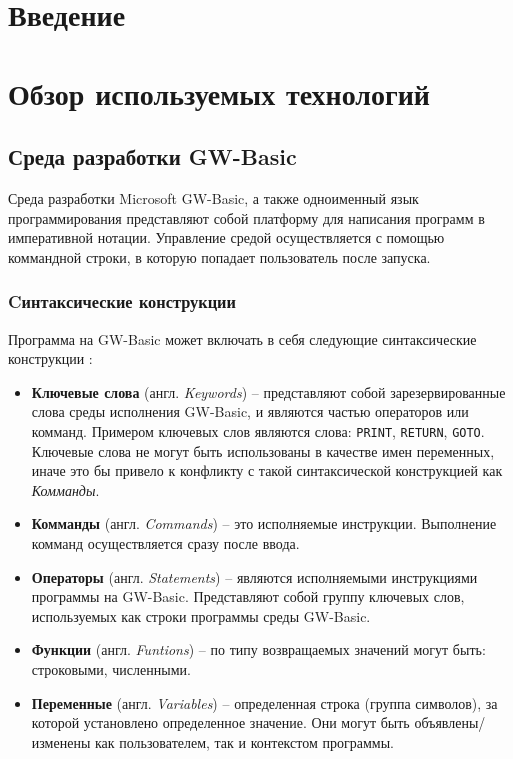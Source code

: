 \documentclass[12pt]{article}
\begin{document}
	\section{Введение}
	\newpage
	\section{Обзор используемых технологий}	
		\subsection{Среда разработки GW-Basic}
			\hspace{\parindent} Среда разработки Microsoft GW-Basic, а также одноименный язык программирования представляют собой платформу для написания программ в императивной нотации. 
			Управление средой осуществляется с помощью коммандной строки, в которую попадает пользователь после запуска.
			\subsubsection{Cинтаксические конструкции}
			\hspace{\parindent} Программа на GW-Basic может включать в себя следующие синтаксические конструкции \cite{basicManual}:
			\begin{itemize}
				\item {\bf Ключевые слова} (англ. {\it Keywords}) -- представляют собой зарезервированные слова среды исполнения GW-Basic, и являются частью операторов или комманд. Примером ключевых слов являются слова: {\tt PRINT}, {\tt RETURN}, {\tt GOTO}. Ключевые слова не могут быть использованы в качестве имен переменных, иначе это бы привело к конфликту с такой синтаксической конструкцией как {\it Комманды}.
				\item {\bf Комманды} (англ. { \it Commands}) -- это исполняемые инструкции. Выполнение комманд осуществляется сразу после ввода.
				\item {\bf Операторы} (англ. {\it Statements}) -- являются исполняемыми инструкциями программы на GW-Basic. Представляют собой группу ключевых слов, используемых как строки программы среды GW-Basic.
				\item {\bf Функции} (англ. {\it Funtions}) -- по типу возвращаемых значений могут быть: строковыми, численными.
				\item {\bf Переменные} (англ. {\it Variables}) -- определенная строка (группа символов), за которой установлено определенное значение. Они могут быть объявлены/изменены как пользователем, так и контекстом программы.
			\end{itemize}
			
\end{document}
